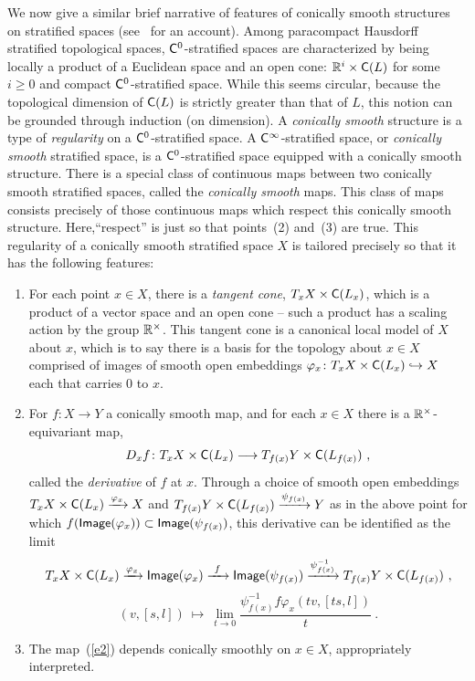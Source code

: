 \documentclass{article}
\newcommand{\xra}{\xrightarrow}
\theoremstyle{definition}
\begin{document}
We now give a similar brief narrative of features of conically smooth structures on stratified spaces (see~\cite{aft1} for an account).
Among paracompact Hausdorff stratified topological spaces, $\mathsf C^0$-stratified spaces are characterized by being locally a product of a Euclidean space and an open cone: $\mathbb R^i\times \mathsf C(L)$ for some $i\geq 0$ and compact $\mathsf C^0$-stratified space.  
While this seems circular, because the topological dimension of $\mathsf C(L)$ is strictly greater than that of $L$, this notion can be grounded through induction (on dimension).
A \emph{conically smooth} structure is a type of \emph{regularity} on a $\mathsf C^0$-stratified space.  
A $\mathsf C^\infty$-stratified space, or \emph{conically smooth} stratified space, is a $\mathsf C^0$-stratified space equipped with a conically smooth structure.  
There is a special class of continuous maps between two conically smooth stratified spaces, called the \emph{conically smooth} maps. This class of maps consists precisely of those continuous maps which respect this conically smooth structure.
Here,``respect'' is just so that points~(2) and~(3) are true.  
This regularity of a conically smooth stratified space $X$ is tailored precisely so that it has the following features:
\begin{enumerate}
\item
For each point $x\in X$, there is a \emph{tangent cone}, $T_x X \times \mathsf C(L_x)$, which is a product of a vector space and an open cone -- such a product has a scaling action by the group $\mathbb R^\times$.  
This tangent cone is a canonical local model of $X$ about $x$, which is to say there is a basis for the topology about $x\in X$ comprised of images of smooth open embeddings $\varphi_x\colon T_x X \times \mathsf C(L_x) \hookrightarrow X$ each that carries $0$ to $x$.

\item
For $f\colon X \to Y$ a conically smooth map, and for each $x\in X$ there is a $\mathbb R^\times$-equivariant map,
\[
D_x f\colon T_x X \times \mathsf C(L_x) 
\longrightarrow 
T_{f(x)} Y \times \mathsf C(L_{f(x)})
~,
\]
called the \emph{derivative} of $f$ at $x$.  
Through a choice of smooth open embeddings $T_x X\times \sC(L_x) \xra{\varphi_x} X$ and $T_{f(x)}Y\times \sC(L_{f(x)}) \xra{\psi_{f(x)}} Y$ as in the above point for which $f({\sf Image}(\varphi_x)) \subset {\sf Image}(\psi_{f(x)})$, this derivative can be identified as the limit
\begin{equation}\label{e2}
T_x X \times \sC(L_x) 
\xra{\varphi_x} 
{\sf Image}(\varphi_x) 
\xra{~f~}  
{\sf Image}( \psi_{f(x)})
\xra{\psi_{f(x)}^{-1}} 
T_{f(x)} Y \times \sC(L_{f(x)})
~,
\end{equation}
\[
(v,[s,l])
~
\mapsto 
~
\lim_{t\to 0} \frac{\psi_{f(x)}^{-1} f \varphi_x(tv,[ts,l])}{t}
~.
\]

\item
The map~(\ref{e2}) depends conically smoothly on $x\in X$, appropriately interpreted.  
\end{enumerate}
\end{document}
